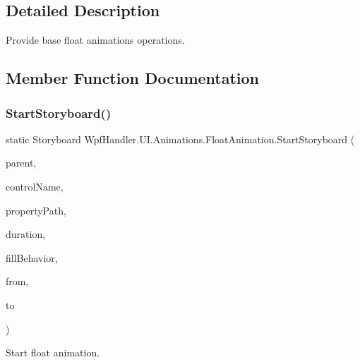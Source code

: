 \subsection{Detailed Description}
Provide base float animations operations. 



\subsection{Member Function Documentation}
\mbox{\label{class_wpf_handler_1_1_u_i_1_1_animations_1_1_float_animation_ac9202e567d294e7f920c55caa8ec6d5d}} 
\subsubsection{\texorpdfstring{Start\+Storyboard()}{StartStoryboard()}\hspace{0.1cm}{\footnotesize\ttfamily [1/3]}}
{\footnotesize\ttfamily static Storyboard Wpf\+Handler.\+U\+I.\+Animations.\+Float\+Animation.\+Start\+Storyboard (\begin{DoxyParamCaption}\item[{Framework\+Element}]{parent,  }\item[{string}]{control\+Name,  }\item[{Property\+Path}]{property\+Path,  }\item[{Time\+Span}]{duration,  }\item[{Fill\+Behavior}]{fill\+Behavior,  }\item[{float}]{from,  }\item[{float}]{to }\end{DoxyParamCaption})\hspace{0.3cm}{\ttfamily [static]}}



Start float animation. 


